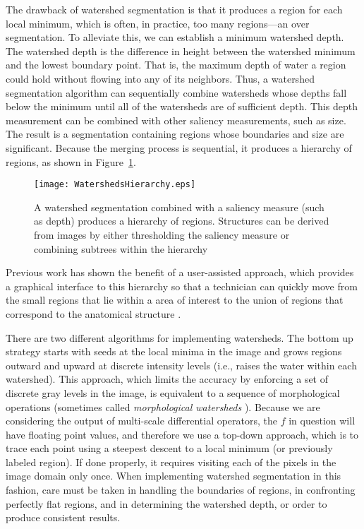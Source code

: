 The drawback of watershed segmentation is that it produces a region for each
local minimum, which is often, in practice, too many regions---an over
segmentation.  To alleviate this, we can establish a minimum watershed depth.
The watershed depth is the difference in height between the watershed minimum
and the lowest boundary point.  That is, the maximum depth of water a region
could hold without flowing into any of its neighbors.  Thus, a watershed
segmentation algorithm can sequentially combine watersheds whose depths fall
below the minimum until all of the watersheds are of sufficient depth.  This
depth measurement can be combined with other saliency measurements, such as
size.  The result is a segmentation containing regions whose boundaries and
size are significant.  Because the merging process is sequential, it produces a
hierarchy of regions, as shown in Figure~\ref{fig:watersheds}.
\begin{figure}
\centering
\texttt{[image: WatershedsHierarchy.eps]}
\caption{A watershed segmentation combined with a saliency measure 
(such as depth) produces a hierarchy of regions.  Structures can be 
derived from images by either thresholding the saliency measure or 
combining subtrees within the hierarchy}
\protect\label{fig:watersheds}
\end{figure}
Previous work has shown the benefit of a user-assisted approach, which provides
a graphical interface to this hierarchy so that a technician can quickly move
from the small regions that lie within a area of interest to the union of
regions that correspond to the anatomical structure \cite{Yoo1991}.

There are two different algorithms for implementing watersheds.  The bottom up
strategy starts with seeds at the local minima in the image and grows regions
outward and upward at discrete intensity levels (i.e., raises the water within
each watershed).  This approach, which limits the accuracy by enforcing a set
of discrete gray levels in the image, is equivalent to a sequence of
morphological operations (sometimes called {\em morphological watersheds}
\cite{Serra1982}).  Because we are considering the output of multi-scale
differential operators, the $f$ in question will have floating point values,
and therefore we use a top-down approach, which is to trace each point using a
steepest descent to a local minimum (or previously labeled region).  If done
properly, it requires visiting each of the pixels in the image domain only
once.  When implementing watershed segmentation in this fashion, care must be
taken in handling the boundaries of regions, in confronting perfectly flat
regions, and in determining the watershed depth, or order to produce consistent
results.

